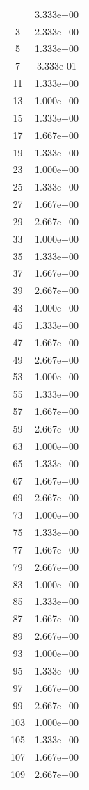 \documentclass[12pt]{article}
\begin{document}
\begin{longtable}{@{}cc@{}}
\bottomrule
\endlastfoot
1 & 3.333e+00 \\
3 & 2.333e+00 \\
5 & 1.333e+00 \\
7 & 3.333e-01 \\
11 & 1.333e+00 \\
13 & 1.000e+00 \\
15 & 1.333e+00 \\
17 & 1.667e+00 \\
19 & 1.333e+00 \\
23 & 1.000e+00 \\
25 & 1.333e+00 \\
27 & 1.667e+00 \\
29 & 2.667e+00 \\
33 & 1.000e+00 \\
35 & 1.333e+00 \\
37 & 1.667e+00 \\
39 & 2.667e+00 \\
43 & 1.000e+00 \\
45 & 1.333e+00 \\
47 & 1.667e+00 \\
49 & 2.667e+00 \\
53 & 1.000e+00 \\
55 & 1.333e+00 \\
57 & 1.667e+00 \\
59 & 2.667e+00 \\
63 & 1.000e+00 \\
65 & 1.333e+00 \\
67 & 1.667e+00 \\
69 & 2.667e+00 \\
73 & 1.000e+00 \\
75 & 1.333e+00 \\
77 & 1.667e+00 \\
79 & 2.667e+00 \\
83 & 1.000e+00 \\
85 & 1.333e+00 \\
87 & 1.667e+00 \\
89 & 2.667e+00 \\
93 & 1.000e+00 \\
95 & 1.333e+00 \\
97 & 1.667e+00 \\
99 & 2.667e+00 \\
103 & 1.000e+00 \\
105 & 1.333e+00 \\
107 & 1.667e+00 \\
109 & 2.667e+00 \\

\end{longtable}
\end{document}

